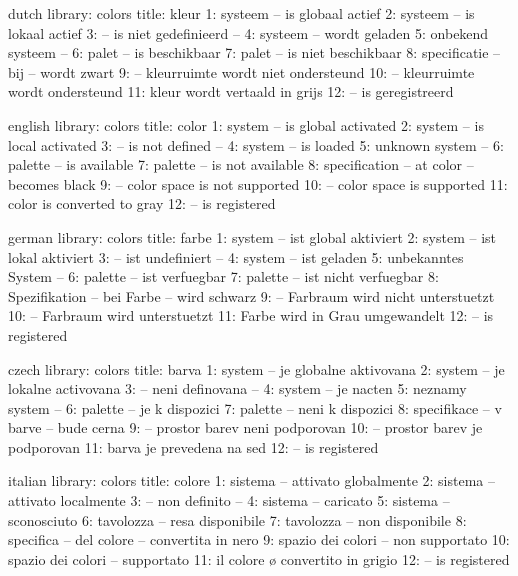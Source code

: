 \startmessages  dutch  library: colors
  title: kleur
      1: systeem -- is globaal actief
      2: systeem -- is lokaal actief
      3: -- is niet gedefinieerd --
      4: systeem -- wordt geladen
      5: onbekend systeem --
      6: palet -- is beschikbaar
      7: palet -- is niet beschikbaar
      8: specificatie -- bij -- wordt zwart
      9: -- kleurruimte wordt niet ondersteund
     10: -- kleurruimte wordt ondersteund
     11: kleur wordt vertaald in grijs
     12: -- is geregistreerd
\stopmessages

\startmessages  english  library: colors
  title: color
      1: system -- is global activated
      2: system -- is local activated
      3: -- is not defined --
      4: system -- is loaded
      5: unknown system --
      6: palette -- is available
      7: palette -- is not available
      8: specification -- at color -- becomes black
      9: -- color space is not supported
     10: -- color space is supported
     11: color is converted to gray
     12: -- is registered
\stopmessages

\startmessages  german  library: colors
  title: farbe
      1: system -- ist global aktiviert
      2: system -- ist lokal aktiviert
      3: -- ist undefiniert --
      4: system -- ist geladen
      5: unbekanntes System --
      6: palette -- ist verfuegbar
      7: palette -- ist nicht verfuegbar
      8: Spezifikation -- bei Farbe -- wird schwarz
      9: -- Farbraum wird nicht unterstuetzt
     10: -- Farbraum wird unterstuetzt
     11: Farbe wird in Grau umgewandelt
     12: -- is registered
\stopmessages

\startmessages  czech  library: colors
  title: barva
      1: system -- je globalne aktivovana
      2: system -- je lokalne activovana
      3: -- neni definovana --
      4: system -- je nacten
      5: neznamy system --
      6: palette -- je k dispozici
      7: palette -- neni k dispozici
      8: specifikace -- v barve -- bude cerna
      9: -- prostor barev neni podporovan
     10: -- prostor barev je podporovan
     11: barva je prevedena na sed
     12: -- is registered
\stopmessages

\startmessages  italian  library: colors
  title: colore
      1: sistema -- attivato globalmente
      2: sistema -- attivato localmente
      3: -- non definito --
      4: sistema -- caricato
      5: sistema -- sconosciuto
      6: tavolozza -- resa disponibile
      7: tavolozza -- non disponibile
      8: specifica -- del colore -- convertita in nero
      9: spazio dei colori -- non supportato
     10: spazio dei colori -- supportato
     11: il colore ø convertito in grigio
     12: -- is registered
\stopmessages

